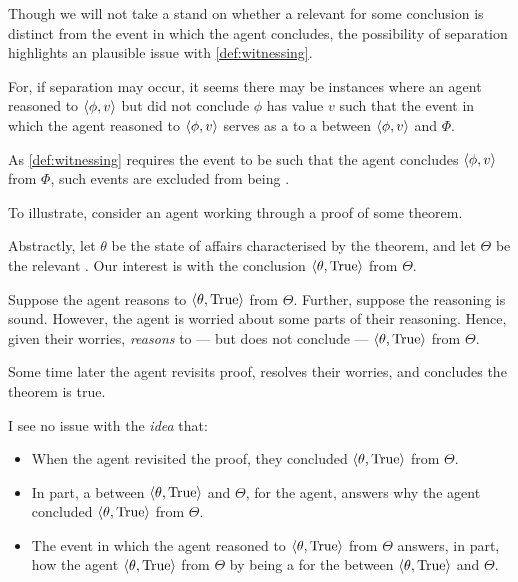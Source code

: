 \begin{note}
  Though we will not take a stand on whether a relevant  for some conclusion is distinct from the event in which the agent concludes, the possibility of separation highlights an plausible issue with \autoref{def:witnessing}.

  For, if separation may occur, it seems there may be instances where an agent reasoned to \(\langle \phi, v \rangle\) but did not conclude \(\phi\) has value \(v\) such that the event in which the agent reasoned to \(\langle \phi, v \rangle\) serves as a  to a \ros{} between \(\langle \phi, v \rangle\) and \(\Phi\).

  As \autoref{def:witnessing} requires the event to be such that the agent concludes \(\langle \phi, v \rangle\) from \(\Phi\), such events are excluded from being .

  To illustrate, consider an agent working through a proof of some theorem.

  Abstractly, let \(\theta\) be the state of affairs characterised by the theorem, and let \(\Theta\) be the relevant \poP{}.
  Our interest is with the conclusion \(\langle \theta, \text{True} \rangle\) from \(\Theta\).

  Suppose the agent reasons to \(\langle \theta, \text{True} \rangle\) from \(\Theta\).
  Further, suppose the \agents{} reasoning is sound.
  However, the agent is worried about some parts of their reasoning.
  Hence, given their worries, \emph{reasons} to --- but does not conclude --- \(\langle \theta, \text{True} \rangle\) from \(\Theta\).

  Some time later the agent revisits proof, resolves their worries, and concludes the theorem is true.

  I see no issue with the \emph{idea} that:
  \begin{itemize}[noitemsep]
  \item
    When the agent revisited the proof, they concluded \(\langle \theta, \text{True} \rangle\) from \(\Theta\).
  \item
    In part, a \ros{} between \(\langle \theta, \text{True} \rangle\) and \(\Theta\), for the agent, answers why the agent concluded \(\langle \theta, \text{True} \rangle\) from \(\Theta\).
  \item
    The event in which the agent reasoned to \(\langle \theta, \text{True} \rangle\) from \(\Theta\) answers, in part, how the agent \(\langle \theta, \text{True} \rangle\) from \(\Theta\) by being a \wit{} for the \ros{} between \(\langle \theta, \text{True} \rangle\) and \(\Theta\).
  \end{itemize}


\end{note}
